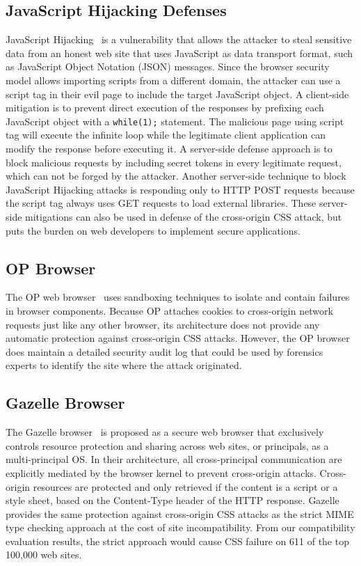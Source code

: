 \documentclass{acm_proc_article-sp}
\begin{document}
\subsection{JavaScript Hijacking Defenses}
JavaScript Hijacking~\cite{jshijacking} is a vulnerability that allows the
attacker to steal sensitive data from an honest web site that uses JavaScript
as data transport format, such as JavaScript Object Notation (JSON) messages.
Since the browser security model allows importing scripts from a different
domain, the attacker can use a script tag in their evil page to include the
target JavaScript object. A client-side mitigation is to prevent direct
execution of the responses by prefixing each JavaScript object with a
\texttt{while(1);} statement. The malicious page using script tag will execute
the infinite loop while the legitimate client application can modify the
response before executing it. A server-side defense approach is to block
malicious requests by including secret tokens in every legitimate request,
which can not be forged by the attacker. Another server-side technique to
block JavaScript Hijacking attacks is responding only to HTTP POST requests
because the script tag always uses GET requests to load external libraries.
These server-side mitigations can also be used in defense of the cross-origin
CSS attack, but puts the burden on web developers to implement secure
applications.

\subsection{OP Browser}
The OP web browser~\cite{op-browser} uses sandboxing techniques to isolate and
contain failures in browser components. Because OP attaches cookies to
cross-origin network requests just like any other browser, its architecture
does not provide any automatic protection against cross-origin CSS attacks.
However, the OP browser does maintain a detailed security audit log that could
be used by forensics experts to identify the site where the attack originated.

\subsection{Gazelle Browser}
The Gazelle browser~\cite{gazelle} is proposed as a secure web browser that exclusively controls resource protection and sharing across web sites, or principals, as a multi-principal OS. In their architecture, all cross-principal communication are explicitly mediated by the browser kernel to prevent cross-origin attacks. Cross-origin resources are protected and only retrieved if the content is a script or a style sheet, based on the Content-Type header of the HTTP response. Gazelle provides the same protection against cross-origin CSS attacks as the strict MIME type checking approach at the cost of site incompatibility. From our compatibility evaluation results, the strict approach would cause CSS failure on 611 of the top 100,000 web sites.
\end{document}
